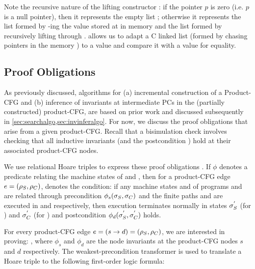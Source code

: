 Note the recursive nature of the lifting constructor : if the pointer $p$ is zero
(i.e. $p$ is a null pointer), then it represents the empty list ;
otherwise it represents the list formed by -ing the value stored at
 in memory \mem{} and the list formed by recursively
lifting  through .
 allows us to adapt a C linked list (formed by chasing pointers
in the memory \mem{}) to a  value and compare it with a \SpecL{} 
value for equality.

\subsection{Proof Obligations}
\label{sec:proofobl}
As previously discussed, algorithms for (a) incremental construction of a Product-CFG
and (b) inference of invariants at intermediate PCs in the (partially constructed) product-CFG, are
based on prior work\cite{oopsla20} and discussed subsequently in \cref{sec:searchalgo,sec:invinferalgo}.
For now, we discuss the proof obligations that arise from a given product-CFG.
Recall that a bisimulation check involves checking that all inductive invariants
(and the postcondition \post{}) hold at their associated product-CFG nodes.

We use relational Hoare triples to express these proof obligations \cite{relationalHoareLogic,hoareTriple}.
If $\phi$ denotes a predicate relating the machine states of \sprog{} and \cprog{}, then
for a product-CFG edge $e=({\tt \rho}_{S},{\tt \rho}_{C})$, 
denotes the condition:
if any machine states \sv{\sigma} and \cv{\sigma} of programs \sprog{} and \cprog{} are related through
precondition $\phi_s({\tt \sigma}_{S},{\tt \sigma}_{C})$ and the finite paths \sv{\rho} and \cv{\rho}
are executed in \sprog{} and \cprog{} respectively,
then execution terminates normally in states ${\tt \sigma}_{S}^{'}$ (for \sprog{}) and
${\tt \sigma}_{C}^{'}$ (for \cprog{}) and postcondition $\phi_d({\tt \sigma}_{S}^{'},{\tt \sigma}_{C}^{'})$ holds.

For every product-CFG edge $e = (s \rightarrow d) = ({\tt \rho}_{S}, {\tt \rho}_{C})$,
we are interested in proving: ,
where $\phi_s$ and $\phi_d$ are the node invariants at the product-CFG nodes $s$ and $d$
respectively.
The weakest-precondition transformer is used to translate a Hoare triple
 to the following
first-order logic formula:

